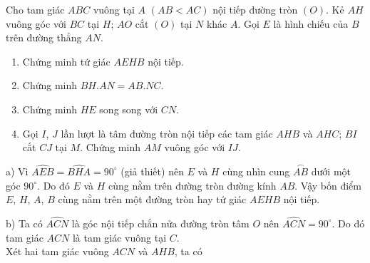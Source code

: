 \begin{ex}%
Cho tam giác $ABC$ vuông tại $A$ $(AB<AC)$ nội tiếp đường tròn $(O)$. Kẻ $AH$ vuông góc với $BC$ tại $H$; $AO$ cắt $(O)$ tại $N$ khác $A$. Gọi $E$ là hình chiếu của $B$ trên đường thẳng $AN$.
    \begin{enumerate}
        \item Chứng minh tứ giác $AEHB$ nội tiếp.
        \item Chứng minh $BH.AN=AB.NC$.
        \item Chứng minh $HE$ song song với $CN$.
        \item Gọi $I$, $J$ lần lượt là tâm đường tròn nội tiếp các tam giác $AHB$ và $AHC$; $BI$ cắt $CJ$ tại $M$. Chứng minh $AM$ vuông góc với $IJ$.
    \end{enumerate}
\loigiai
{
{}
{\par a) Vì $\widehat{AEB}=\widehat{BHA}=90^\circ$ (giả thiết) nên $E$ và $H$ cùng nhìn cung $\stackrel\frown{AB}$ dưới một góc $90^\circ$. Do đó $E$ và $H$ cùng nằm trên đường tròn đường kính $AB$. Vậy bốn điểm $E$, $H$, $A$, $B$ cùng nằm trên một đường tròn hay tứ giác $AEHB$ nội tiếp.
\par b) Ta có $\widehat{ACN}$ là góc nội tiếp chắn nửa đường tròn tâm $O$ nên $\widehat{ACN}=90^\circ$. Do đó tam giác $ACN$ là tam giác vuông tại $C$.\\
Xét hai tam giác vuông $ACN$ và $AHB$, ta có
}}
\end{ex}
